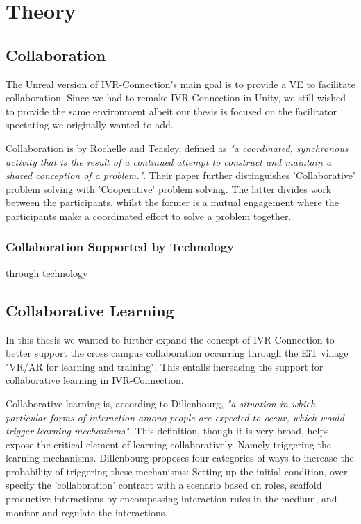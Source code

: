 \chapter{Theory}

    \section{Collaboration}
        The Unreal version of IVR-Connection's main goal is to provide a VE to facilitate collaboration. Since we had to remake IVR-Connection in Unity, we still wished to provide the same environment albeit our thesis is focused on the facilitator spectating we originally wanted to add.
        
        Collaboration is by Rochelle and Teasley, defined as \emph{"a coordinated, synchronous activity that is the result of a continued attempt to construct and maintain a shared conception of a problem."}\cite{Roschelle1995}. Their paper further distinguishes 'Collaborative' problem solving with 'Cooperative' problem solving. The latter divides work between the participants, whilst the former is a mutual engagement where the participants make a coordinated effort to solve a problem together. \cite{Roschelle1995}
        
        
        
        \subsection{Collaboration Supported by Technology}
        through technology
    
    \section{Collaborative Learning}
        In this thesis we wanted to further expand the concept of IVR-Connection to better support the cross campus collaboration occurring through the EiT village "VR/AR for learning and training". This entails increasing the support for collaborative learning in IVR-Connection.
    
        Collaborative learning is, according to Dillenbourg, \emph{"a situation in which particular forms of interaction among people are expected to occur, which would trigger learning mechanisms".} \cite{dillenbourg1999} This definition, though it is very broad, helps expose the critical element of learning collaboratively. Namely triggering the learning mechanisms. Dillenbourg proposes four categories of ways to increase the probability of triggering these mechanisms: Setting up the initial condition, over-specify the 'collaboration' contract with a scenario based on roles, scaffold productive interactions by encompassing interaction rules in the medium, and monitor and regulate the interactions. \cite{dillenbourg1999}
        

